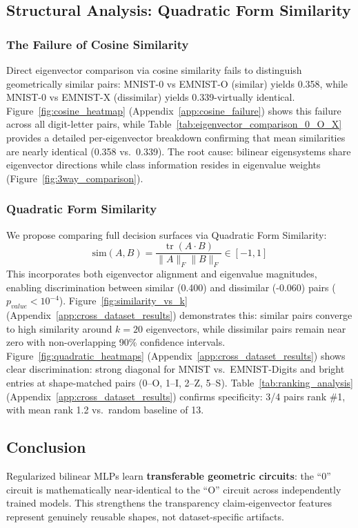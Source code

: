 \subsection{Structural Analysis: Quadratic Form Similarity}

\subsubsection{The Failure of Cosine Similarity}

Direct eigenvector comparison via cosine similarity fails to distinguish geometrically similar pairs: MNIST-0 vs EMNIST-O (similar) yields 0.358, while MNIST-0 vs EMNIST-X (dissimilar) yields 0.339-virtually identical.
Figure~\ref{fig:cosine_heatmap} (Appendix~\ref{app:cosine_failure}) shows this failure across all digit-letter pairs, while Table~\ref{tab:eigenvector_comparison_0_O_X} provides a detailed per-eigenvector breakdown confirming that mean similarities are nearly identical (0.358 vs.\ 0.339).
The root cause: bilinear eigensystems share eigenvector directions while class information resides in eigenvalue weights (Figure~\ref{fig:3way_comparison}).

\subsubsection{Quadratic Form Similarity}

We propose comparing full decision surfaces via Quadratic Form Similarity:
\begin{equation}
\mathrm{sim}(A,B) = \frac{\operatorname{tr}(A \cdot B)}{\|A\|_F \|B\|_F} \in [-1, 1]
\end{equation}
This incorporates both eigenvector alignment and eigenvalue magnitudes, enabling discrimination between similar (0.400) and dissimilar (-0.060) pairs ($p_{value} < 10^{-4}$).
Figure~\ref{fig:similarity_vs_k} (Appendix~\ref{app:cross_dataset_results}) demonstrates this: similar pairs converge to high similarity around $k=20$ eigenvectors, while dissimilar pairs remain near zero with non-overlapping 90\% confidence intervals.
Figure~\ref{fig:quadratic_heatmaps} (Appendix~\ref{app:cross_dataset_results}) shows clear discrimination: strong diagonal for MNIST vs.\ EMNIST-Digits and bright entries at shape-matched pairs (0--O, 1--I, 2--Z, 5--S).
Table~\ref{tab:ranking_analysis} (Appendix~\ref{app:cross_dataset_results}) confirms specificity: 3/4 pairs rank \#1, with mean rank 1.2 vs.\ random baseline of 13.

\subsection{Conclusion}

Regularized bilinear MLPs learn \textbf{transferable geometric circuits}: the ``0'' circuit is mathematically near-identical to the ``O'' circuit across independently trained models.
This strengthens the transparency claim-eigenvector features represent genuinely reusable shapes, not dataset-specific artifacts.
